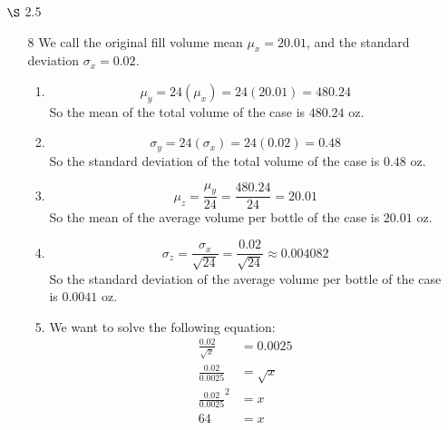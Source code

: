 \documentclass[12pt,letterpaper]{article}
\begin{document}
\begin{enumerate}
\begin{enumerate}
\begin{enumerate}[label=(\arabic*)]
              \[
                F(2.5) = 1 - \frac{1}{2.5^2} = 1 - \frac{1}{6.25} = 1 - \frac{4}{25} = \frac{84}{100}
              \]

              So $84\%$ of the contaminating particles are smaller than \SI{2.5}{\micro\meter}.
            \item
              The proportion $PM_{2.5}$ of $PM_{10}$ is
              \[
                \frac{\frac{84}{100}}{\frac{99}{100}} = \frac{84}{99} = 0.\overline{84}
              \]
              or $84.85\%$.
          \end{enumerate}
      \end{enumerate}
    \item [$\S$ 2.5]
      \begin{enumerate}
        \item [8]
          We call the original fill volume mean $\mu_x = 20.01$,
          and the standard deviation $\sigma_x = 0.02$.
          \begin{enumerate}[label=(\arabic*)]
            \item
              \[
                \mu_y = 24(\mu_x) = 24(20.01) = 480.24
              \]
              So the mean of the total volume of the case is $480.24$ oz.
            \item
              \[
                \sigma_y = 24(\sigma_x) = 24(0.02) = 0.48
              \]
              So the standard deviation of the total volume of the case is $0.48$ oz.
            \item
              \[
                \mu_z = \frac{\mu_y}{24} = \frac{480.24}{24} = 20.01
              \]
              So the mean of the average volume per bottle of the case is $20.01$ oz.
            \item
              \[
                \sigma_z = \frac{\sigma_x}{\sqrt{24}} = \frac{0.02}{\sqrt{24}} \approx 0.004082
              \]
              So the standard deviation of the average volume per bottle of the case is $0.0041$ oz.
            \item
              We want to solve the following equation:
              \begin{align*}
                \frac{0.02}{\sqrt{x}} &= 0.0025 \\
                \frac{0.02}{0.0025} &= \sqrt{x} \\
                \frac{0.02}{0.0025}^2 &= x \\
                64 &= x \\
              \end{align*}

\end{enumerate}
\end{enumerate}
\end{enumerate}
\end{document}
